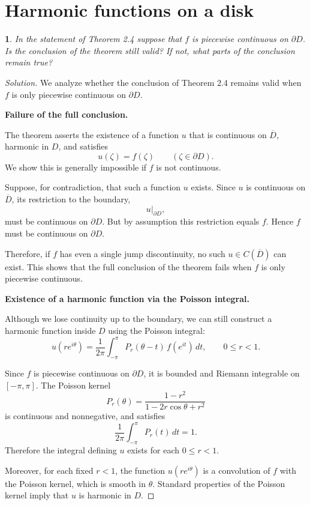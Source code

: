 \documentclass[12pt, a4paper]{report}
\theoremstyle{spaced}
\newtheorem{exercise}{}
\newcommand{\setexercise}[1]{\setcounter{exercise}{#1-1}}
\begin{document}
\section{Harmonic functions on a disk}
\setexercise{2}
\begin{exercise}
	In the statement of Theorem 2.4 suppose that $f$ is piecewise continuous on $\partial D$. Is the conclusion of the theorem still valid? If not, what parts of the conclusion remain true?
\end{exercise}
\begin{proof}[Solution]
	We analyze whether the conclusion of Theorem 2.4 remains valid when $f$ is only piecewise continuous on $\partial D$.

	\medskip

	\noindent
	\textbf{Failure of the full conclusion.}

	The theorem asserts the existence of a function $u$ that is continuous on $\overline D$, harmonic in $D$, and satisfies
	\[
		u(\zeta)=f(\zeta)\qquad (\zeta\in\partial D).
	\]
	We show this is generally impossible if $f$ is not continuous.

	Suppose, for contradiction, that such a function $u$ exists. Since $u$ is continuous on $\overline D$, its restriction to the boundary,
	\[
		u|_{\partial D},
	\]
	must be continuous on $\partial D$. But by assumption this restriction equals $f$. Hence $f$ must be continuous on $\partial D$.

	Therefore, if $f$ has even a single jump discontinuity, no such $u\in C(\overline D)$ can exist. This shows that the full conclusion of the theorem fails when $f$ is only piecewise continuous.

	\medskip

	\noindent
	\textbf{Existence of a harmonic function via the Poisson integral.}

	Although we lose continuity up to the boundary, we can still construct a harmonic function inside $D$ using the Poisson integral:
	\[
		u(re^{i\theta})
		=
		\frac{1}{2\pi}\int_{-\pi}^{\pi} P_r(\theta-t)\,f(e^{it})\,dt,
		\qquad 0\le r<1.
	\]

	Since $f$ is piecewise continuous on $\partial D$, it is bounded and Riemann integrable on $[-\pi,\pi]$. The Poisson kernel
	\[
		P_r(\theta)=\frac{1-r^2}{1-2r\cos\theta+r^2}
	\]
	is continuous and nonnegative, and satisfies
	\[
		\frac{1}{2\pi}\int_{-\pi}^{\pi} P_r(t)\,dt=1.
	\]
	Therefore the integral defining $u$ exists for each $0\le r<1$.

	Moreover, for each fixed $r<1$, the function $u(re^{i\theta})$ is a convolution of $f$ with the Poisson kernel, which is smooth in $\theta$. Standard properties of the Poisson kernel imply that $u$ is harmonic in $D$.


\end{proof}
\end{document}
